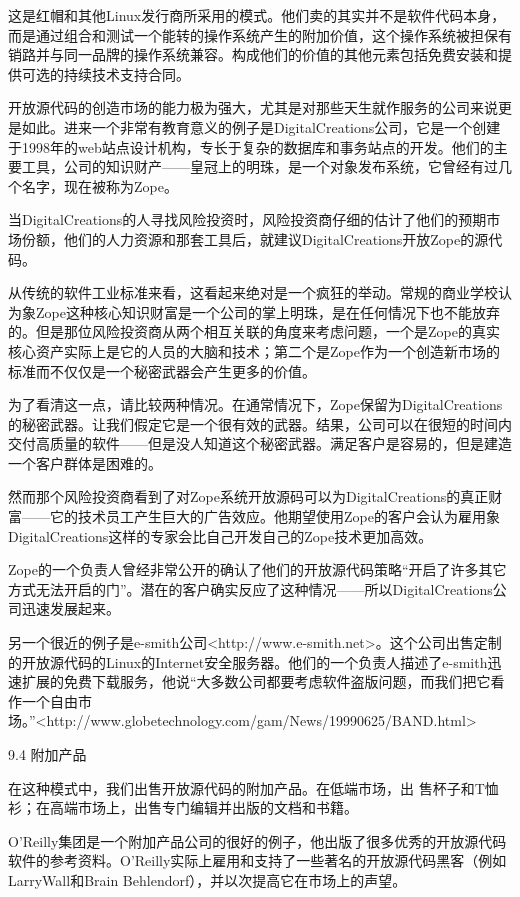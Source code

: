 \documentclass[a4paper,12pt,UTF8,twoside]{ctexbook}
\begin{document}
这是红帽和其他Linux发行商所采用的模式。他们卖的其实并不是软件代码本身，而是通过组合和测试一个能转的操作系统产生的附加价值，这个操作系统被担保有销路并与同一品牌的操作系统兼容。构成他们的价值的其他元素包括免费安装和提供可选的持续技术支持合同。


开放源代码的创造市场的能力极为强大，尤其是对那些天生就作服务的公司来说更是如此。进来一个非常有教育意义的例子是DigitalCreations公司，它是一个创建于1998年的web站点设计机构，专长于复杂的数据库和事务站点的开发。他们的主要工具，公司的知识财产——皇冠上的明珠，是一个对象发布系统，它曾经有过几个名字，现在被称为Zope。


当DigitalCreations的人寻找风险投资时，风险投资商仔细的估计了他们的预期市场份额，他们的人力资源和那套工具后，就建议DigitalCreations开放Zope的源代码。


从传统的软件工业标准来看，这看起来绝对是一个疯狂的举动。常规的商业学校认为象Zope这种核心知识财富是一个公司的掌上明珠，是在任何情况下也不能放弃的。但是那位风险投资商从两个相互关联的角度来考虑问题，一个是Zope的真实核心资产实际上是它的人员的大脑和技术；第二个是Zope作为一个创造新市场的标准而不仅仅是一个秘密武器会产生更多的价值。


为了看清这一点，请比较两种情况。在通常情况下，Zope保留为DigitalCreations的秘密武器。让我们假定它是一个很有效的武器。结果，公司可以在很短的时间内交付高质量的软件——但是没人知道这个秘密武器。满足客户是容易的，但是建造一个客户群体是困难的。


然而那个风险投资商看到了对Zope系统开放源码可以为DigitalCreations的真正财富——它的技术员工产生巨大的广告效应。他期望使用Zope的客户会认为雇用象DigitalCreations这样的专家会比自己开发自己的Zope技术更加高效。


Zope的一个负责人曾经非常公开的确认了他们的开放源代码策略“开启了许多其它方式无法开启的门”。潜在的客户确实反应了这种情况——所以DigitalCreations公司迅速发展起来。


另一个很近的例子是e-smith公司<http://www.e-smith.net>。这个公司出售定制的开放源代码的Linux的Internet安全服务器。他们的一个负责人描述了e-smith迅速扩展的免费下载服务，他说“大多数公司都要考虑软件盗版问题，而我们把它看作一个自由市场。”<http://www.globetechnology.com/gam/News/19990625/BAND.html>


9.4 附加产品


在这种模式中，我们出售开放源代码的附加产品。在低端市场，出 售杯子和T恤衫；在高端市场上，出售专门编辑并出版的文档和书籍。


O'Reilly集团是一个附加产品公司的很好的例子，他出版了很多优秀的开放源代码软件的参考资料。O'Reilly实际上雇用和支持了一些著名的开放源代码黑客（例如LarryWall和Brain Behlendorf），并以次提高它在市场上的声望。
\end{document}
